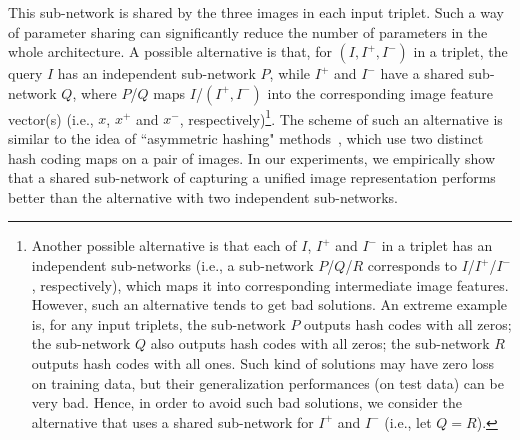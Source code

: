 \documentclass[10pt,twocolumn,letterpaper]{article}
\begin{document}
This sub-network is shared by the three images in each input
triplet. Such a way of parameter sharing can significantly reduce
the number of parameters in the whole architecture. A possible
alternative is that, for $(I,I^+,I^-)$ in a triplet, the query $I$
has an independent sub-network $P$, while $I^+$ and $I^-$ have a shared
sub-network $Q$, where $P$/$Q$ maps $I$/$(I^+,I^-)$ into
the corresponding image feature vector(s) (i.e., $x$, $x^+$ and
$x^-$, respectively)\footnote{Another possible alternative is that each of
$I$, $I^+$ and $I^-$ in a triplet has an independent sub-networks
(i.e., a sub-network $P$/$Q$/$R$ corresponds to $I$/$I^+$/$I^-$,
respectively), which maps it into corresponding intermediate image features.
However, such an alternative tends to get bad solutions. An extreme
example is, for any input triplets, the sub-network $P$ outputs hash
codes with all zeros; the sub-network $Q$ also outputs hash codes
with all zeros; the sub-network $R$ outputs hash codes with all
ones. Such kind of solutions may have zero loss on training data,
but their generalization performances (on test data) can be very
bad. Hence, in order to avoid such bad solutions, we consider the alternative that uses a shared sub-network for $I^+$ and $I^-$ (i.e., let $Q=R$).}. The scheme of such an alternative is similar to the idea of
``asymmetric hashing" methods~\cite{asymmetryhash}, which use two distinct hash coding
maps on a pair of images. In our experiments, we empirically show
that a shared sub-network of capturing a unified image
representation performs better than the alternative with two
independent sub-networks.
\end{document}
